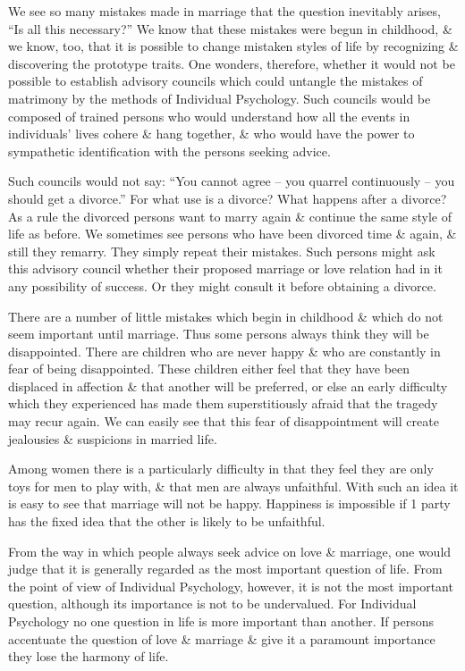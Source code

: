 \documentclass{article}
\begin{document}
We see so many mistakes made in marriage that the question inevitably arises, ``Is all this necessary?'' We know that these mistakes were begun in childhood, \& we know, too, that it is possible to change mistaken styles of life by recognizing \& discovering the prototype traits. One wonders, therefore, whether it would not be possible to establish advisory councils which could untangle the mistakes of matrimony by the methods of Individual Psychology. Such councils would be composed of trained persons who would understand how all the events in individuals' lives cohere \& hang together, \& who would have the power to sympathetic identification with the persons seeking advice.

Such councils would not say: ``You cannot agree -- you quarrel continuously -- you should get a divorce.'' For what use is a divorce? What happens after a divorce? As a rule the divorced persons want to marry again \& continue the same style of life as before. We sometimes see persons who have been divorced time \& again, \& still they remarry. They simply repeat their mistakes. Such persons might ask this advisory council whether their proposed marriage or love relation had in it any possibility of success. Or they might consult it before obtaining a divorce.

There are a number of little mistakes which begin in childhood \& which do not seem important until marriage. Thus some persons always think they will be disappointed. There are children who are never happy \& who are constantly in fear of being disappointed. These children either feel that they have been displaced in affection \& that another will be preferred, or else an early difficulty which they experienced has made them superstitiously afraid that the tragedy may recur again. We can easily see that this fear of disappointment will create jealousies \& suspicions in married life.

Among women there is a particularly difficulty in that they feel they are only toys for men to play with, \& that men are always unfaithful. With such an idea it is easy to see that marriage will not be happy. Happiness is impossible if 1 party has the fixed idea that the other is likely to be unfaithful.

From the way in which people always seek advice on love \& marriage, one would judge that it is generally regarded as the most important question of life. From the point of view of Individual Psychology, however, it is not the most important question, although its importance is not to be undervalued. For Individual Psychology no one question in life is more important than another. If persons accentuate the question of love \& marriage \& give it a paramount importance they lose the harmony of life.
\end{document}
